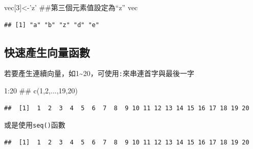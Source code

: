 \documentclass[]{book}
\newenvironment{Shaded}{\begin{snugshade}}{\end{snugshade}}
\newcommand{\KeywordTok}[1]{\textcolor[rgb]{0.13,0.29,0.53}{\textbf{{#1}}}}
\newcommand{\DataTypeTok}[1]{\textcolor[rgb]{0.13,0.29,0.53}{{#1}}}
\newcommand{\DecValTok}[1]{\textcolor[rgb]{0.00,0.00,0.81}{{#1}}}
\newcommand{\StringTok}[1]{\textcolor[rgb]{0.31,0.60,0.02}{{#1}}}
\newcommand{\NormalTok}[1]{{#1}}
\theoremstyle{definition}
\theoremstyle{definition}
\theoremstyle{remark}
\begin{document}
\begin{Shaded}
\begin{Highlighting}[]
\NormalTok{vec[}\DecValTok{3}\NormalTok{]<-}\StringTok{'z'} \NormalTok{##第三個元素值設定為“z”}
\NormalTok{vec}
\end{Highlighting}
\end{Shaded}

\begin{verbatim}
## [1] "a" "b" "z" "d" "e"
\end{verbatim}

\subsection{快速產生向量函數}

若要產生連續向量，如1\textasciitilde{}20，可使用\texttt{:}來串連首字與最後一字

\begin{Shaded}
\begin{Highlighting}[]
\DecValTok{1}\NormalTok{:}\DecValTok{20} \NormalTok{## c(1,2,...,19,20)}
\end{Highlighting}
\end{Shaded}

\begin{verbatim}
##  [1]  1  2  3  4  5  6  7  8  9 10 11 12 13 14 15 16 17 18 19 20
\end{verbatim}

或是使用\texttt{seq()}函數

\begin{Shaded}
\end{Shaded}

\begin{verbatim}
##  [1]  1  2  3  4  5  6  7  8  9 10 11 12 13 14 15 16 17 18 19 20
\end{verbatim}

\begin{Shaded}
\end{Shaded}
\end{document}
